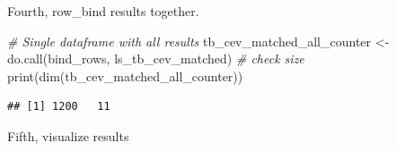 \documentclass[
]{book}
\newenvironment{Shaded}{\begin{snugshade}}{\end{snugshade}}
\newcommand{\CommentTok}[1]{\textcolor[rgb]{0.56,0.35,0.01}{\textit{#1}}}
\newcommand{\FunctionTok}[1]{\textcolor[rgb]{0.00,0.00,0.00}{#1}}
\newcommand{\NormalTok}[1]{#1}
\newcommand{\OtherTok}[1]{\textcolor[rgb]{0.56,0.35,0.01}{#1}}
\begin{document}
Fourth, row\_bind results together.

\begin{Shaded}
\begin{Highlighting}[]
\CommentTok{\# Single dataframe with all results}
\NormalTok{tb\_cev\_matched\_all\_counter }\OtherTok{\textless{}{-}} \FunctionTok{do.call}\NormalTok{(bind\_rows, ls\_tb\_cev\_matched)}
\CommentTok{\# check size}
\FunctionTok{print}\NormalTok{(}\FunctionTok{dim}\NormalTok{(tb\_cev\_matched\_all\_counter))}
\end{Highlighting}
\end{Shaded}

\begin{verbatim}
## [1] 1200   11
\end{verbatim}

Fifth, visualize results
\end{document}
